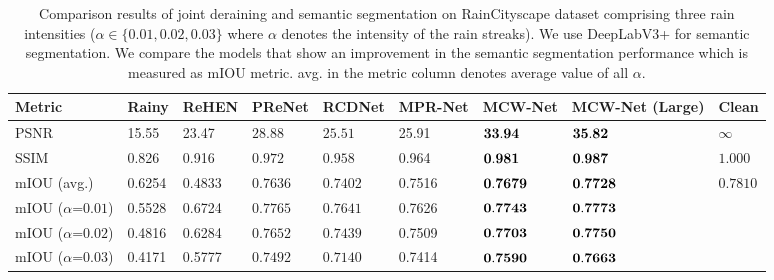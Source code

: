 \documentclass[a4paper,fleqn]{cas-dc}
\begin{document}
\begin{table*}[]
	\centering
	\caption{ Comparison results of joint deraining and semantic segmentation on RainCityscape dataset comprising three rain intensities ($\alpha \in \{0.01,0.02,0.03 \}$ where $\alpha$ denotes the intensity of the rain streaks). We use DeepLabV3+ \cite{chen2018encoder} for semantic segmentation. We compare the models that show an improvement in the semantic segmentation performance which is measured as mIOU metric. avg. in the metric column denotes average value of all $\alpha$.
	}
	\begin{tabular*}{\tblwidth}{@{}LLLLLLLLL@{}}
		\toprule
		Metric  &  Rainy   &   ReHEN    & PReNet                      & RCDNet      &  MPR-Net &  MCW-Net  &  MCW-Net (Large) &  Clean   \\ \midrule


		PSNR                   &  15.55  & 23.47 & $28.88$                           &   $25.51$     &25.91           &   $\bold{33.94}$  & $\bold{35.82}$  &  $\infty$   \\ 
		SSIM                   &  0.826  & 0.916 & $0.972$                           &   $0.958$        &   0.964          &   $\bold{0.981}$  & $\bold{0.987}$    &  $1.000$   \\ 


		mIOU (avg.)                &  0.6254 & 0.4833 & $0.7636$                         &  $0.7402$                   &  0.7516       &   $\bold{0.7679}$  & $\bold{0.7728}$     & $0.7810$\\ 
		mIOU ($\alpha$=$0.01$)                  & 0.5528 &  0.6724  & $0.7765$                         &  $0.7641$        & 0.7626              &   $\bold{0.7743}$  & $\bold{0.7773}$     &  \\ 
		mIOU ($\alpha$=$0.02$)                  & 0.4816 &  0.6284  & $0.7652$                         &  $0.7439$        & 0.7509            &   $\bold{0.7703}$   & $\bold{0.7750}$   &  \\ 
		mIOU ($\alpha$=$0.03$)                  & 0.4171 &  0.5777  & $0.7492$                         &  $0.7140$        & 0.7414            &   $\bold{0.7590}$  & $\bold{0.7663}$      &  \\   \bottomrule
		
\end{tabular*}
\label{table:cityscape}

\end{table*}
\end{document}
